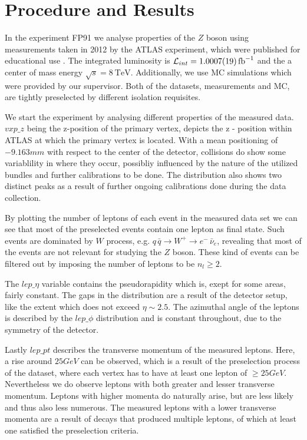 \documentclass[11 pt]{article}
\begin{document}
\section{Procedure and Results}
In the experiment FP91 we analyse properties of the $Z$ boson using measurements taken in 2012 by the ATLAS experiment, which were published for educational use \footnotemark {} \footnotemark {}. The integrated luminosity is $\mathcal{L}_{int} = \SI{1.0007\pm 0.0019}{\femto\barn^{-1}}$ and the a center of mass energy $\sqrt{s} = \SI{8}{\tera\electronvolt}$. Additionally, we use MC simulations which were provided by our supervisor. Both of the datasets, measurements and MC, are tightly preselected by different isolation requisites.

We start the experiment by analysing different properties of the measured data. $vxp\_z$ being the z-position of the primary vertex, depicts the z - position within ATLAS at which the primary vertex is located. With a mean positioning of $-9.163mm$ with respect to the center of the detector, collisions do show some variablility in where they occur, possibliy influenced by the nature of the utilized bundles and further calibrations to be done. The distribution also shows two distinct peaks as a result of further ongoing calibrations done during the data collection.

By plotting the number of leptons of each event in the measured data set we can see that most of the preselected events contain one lepton as final state. Such events are dominated by $W$ process, e.g. $q\, \bar{q} \to W^+ \to e^-\, \bar{\nu}_e$, revealing that most of the events are not relevant for studying the $Z$ boson. These kind of events can be filtered out by imposing the number of leptons to be $n_l \geq 2$. 

The $lep\_\eta$ variable contains the pseudorapidity which is, exept for some areas, fairly constant. The gaps in the distribution are a result of the detector setup, like the extent which does not exceed $\eta \sim 2.5 $.
The azimuthal angle of the leptons is described by the $lep\_\phi$ distribution and is constant throughout, due to the symmetry of the detector.

Lastly $lep\_pt$ describes the transverse momentum of the measured leptons. Here, a rise around $25GeV$ can be observed, which is a result of the preselection process of the dataset, where each vertex has to have at least one lepton of $\geq25GeV$. Nevertheless we do observe leptons with both greater and lesser transverse momentum. Leptons with higher momenta do naturally arise, but are less likely and thus also less numerous. The measured leptons with a lower transverse momenta are a result of decays that produced  multiple leptons, of which at least one satisfied the preselection criteria.
\end{document}
